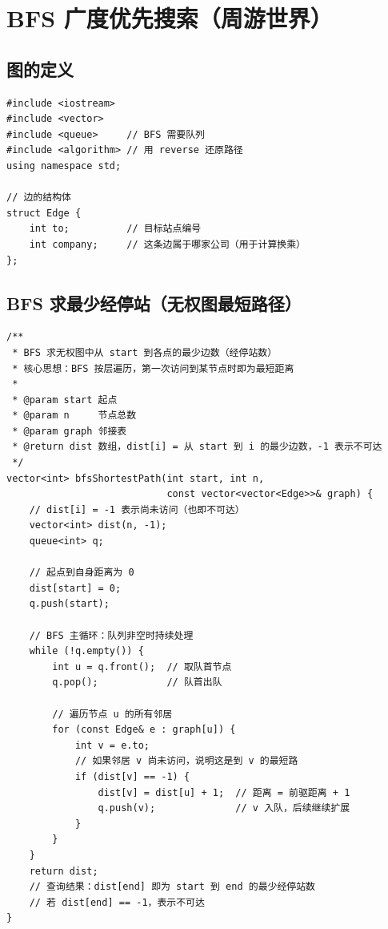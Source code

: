 \documentclass[12pt,a4paper]{article}
\begin{document}
\newpage

\section{BFS 广度优先搜索（周游世界）}

\subsection{图的定义}

\begin{lstlisting}
#include <iostream>
#include <vector>
#include <queue>     // BFS 需要队列
#include <algorithm> // 用 reverse 还原路径
using namespace std;

// 边的结构体
struct Edge {
    int to;          // 目标站点编号
    int company;     // 这条边属于哪家公司（用于计算换乘）
};
\end{lstlisting}

\subsection{BFS 求最少经停站（无权图最短路径）}

\begin{lstlisting}
/**
 * BFS 求无权图中从 start 到各点的最少边数（经停站数）
 * 核心思想：BFS 按层遍历，第一次访问到某节点时即为最短距离
 *
 * @param start 起点
 * @param n     节点总数
 * @param graph 邻接表
 * @return dist 数组，dist[i] = 从 start 到 i 的最少边数，-1 表示不可达
 */
vector<int> bfsShortestPath(int start, int n,
                            const vector<vector<Edge>>& graph) {
    // dist[i] = -1 表示尚未访问（也即不可达）
    vector<int> dist(n, -1);
    queue<int> q;

    // 起点到自身距离为 0
    dist[start] = 0;
    q.push(start);

    // BFS 主循环：队列非空时持续处理
    while (!q.empty()) {
        int u = q.front();  // 取队首节点
        q.pop();            // 队首出队

        // 遍历节点 u 的所有邻居
        for (const Edge& e : graph[u]) {
            int v = e.to;
            // 如果邻居 v 尚未访问，说明这是到 v 的最短路
            if (dist[v] == -1) {
                dist[v] = dist[u] + 1;  // 距离 = 前驱距离 + 1
                q.push(v);              // v 入队，后续继续扩展
            }
        }
    }
    return dist;
    // 查询结果：dist[end] 即为 start 到 end 的最少经停站数
    // 若 dist[end] == -1，表示不可达
}
\end{lstlisting}
\end{document}
